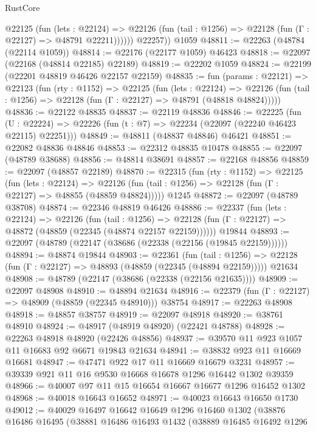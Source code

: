 \begin{lexlean}{RustCore}
\begin{coremodule}
            @22125
              (fun (lets : @22124) =>
              @22126 (fun (tail : @1256) => @22128 (fun (Γ : @22127) => @48791 @22211))))))
        @22257))
    @1059
@48811 := @22263 (@48784 (@22114 @1059))
@48814 := @22176 (@22177 @1059) @46423
@48818 := @22097 (@22168 (@48814 @22185) @22189)
@48819 := @22202 @1059
@48824 := @22199 (@22201 @48819 @46426 @22157 @22159)
@48835 := fun (params : @22121) =>
  @22123
    (fun (rty : @1152) =>
    @22125
      (fun (lets : @22124) =>
      @22126 (fun (tail : @1256) => @22128 (fun (Γ : @22127) => @48791 (@48818 @48824)))))
@48836 := @22122 @48835
@48837 := @22119 @48836
@48846 := @22225
    (fun (U : @22224) => @22226 (fun (t : @7) => @22234 (@22097 (@22240 @46423 @22115) @22251)))
@48849 := @48811 (@48837 @48846) @46421
@48851 := @22082 @48836 @48846
@48853 := @22312 @48835 @10478
@48855 := @22097 (@48789 @38688)
@48856 := @48814 @38691
@48857 := @22168 @48856
@48859 := @22097 (@48857 @22189)
@48870 := @22315
    (fun (rty : @1152) =>
    @22125
      (fun (lets : @22124) =>
      @22126 (fun (tail : @1256) => @22128 (fun (Γ : @22127) => @48855 (@48859 @48824)))))
    @1245
@48872 := @22097 (@48789 @38708)
@48874 := @22346 @48819 @46426
@48886 := @22337
    (fun (lets : @22124) =>
    @22126
      (fun (tail : @1256) =>
      @22128 (fun (Γ : @22127) => @48872 (@48859 (@22345 (@48874 @22157 @22159))))))
    @19844
@48893 := @22097 (@48789 (@22147 (@38686 (@22338 (@22156 (@19845 @22159))))))
@48894 := @48874 @19844
@48903 := @22361
    (fun (tail : @1256) => @22128 (fun (Γ : @22127) => @48893 (@48859 (@22345 (@48894 @22159)))))
    @21634
@48908 := @48789 (@22147 (@38686 (@22338 (@22156 @21635))))
@48909 := @22097 @48908
@48910 := @48894 @21634
@48916 := @22379 (fun (Γ : @22127) => @48909 (@48859 (@22345 @48910))) @38754
@48917 := @22263 @48908
@48918 := @48857 @38757
@48919 := @22097 @48918
@48920 := @38761 @48910
@48924 := @48917 (@48919 @48920) (@22421 @48788)
@48928 := @22263 @48918 @48920 (@22426 @48856)
@48937 := @39570 @11 @923 @1057 @11 @16683 @92 @6671 @19843 @21634
@48941 := @38832 @923 @11 @16669 @16681
@48947 := @47471 @922 @17 @11 @16669 @16679 @3231
@48957 := @39339 @921 @11 @16 @9530 @16668 @16678 @1296 @16442 @1302 @39359
@48966 := @40007 @97 @11 @15 @16654 @16667 @16677 @1296 @16452 @1302
@48968 := @40018 @16643 @16652
@48971 := @40023 @16643 @16650 @1730
@49012 := @40029
    @16497
    @16642
    @16649
    @1296
    @16460
    @1302
    (@38876
      @16486
      @16495
      (@38881
        @16486
        @16493
        @1432
        (@38889
          @16485
          @16492
          @1296

\end{coremodule}
\end{lexlean}
